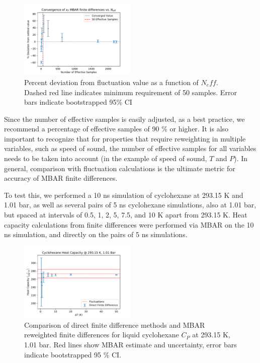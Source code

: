 \documentclass[9pt,bestpractices]{livecoms}
\begin{document}
\begin{figure}[H]
\includegraphics[width=0.5\textwidth]{kt_vs_n_eff.pdf}
\caption{Percent deviation from fluctuation value as a function of $N_eff$.  Dashed red line indicates minimum requirement of 50 samples.  Error bars indicate bootstrapped 95\% CI}
\end{figure}

  Since the number of effective samples is easily adjusted, as a best practice, we recommend a percentage of effective samples of 90 \% or higher.  It is also important to recognize that for properties that require reweighting in multiple variables, such as speed of sound, the number of effective samples for all variables needs to be taken into account (in the example of speed of sound, $T$ and $P$).  In general, comparison with fluctuation calculations is the ultimate metric for accuracy of MBAR finite differences.

To test this, we performed a 10 ns simulation of cyclohexane at 293.15 K and 1.01 bar, as well as several pairs of 5 ns cyclohexane simulations, also at 1.01 bar, but spaced at intervals of 0.5, 1, 2, 5, 7.5, and 10 K apart from 293.15 K. Heat capacity calculations from finite differences were performed via MBAR on the 10 ns simulation, and directly on the pairs of 5 ns simulations. 
\begin{figure}[H]
\includegraphics[width=0.5\textwidth]{cychex_cp_finite_diff.pdf}
\caption{Comparison of direct finite difference methods and MBAR reweighted finite differences for liquid cyclohexane $C_P$ at 293.15 K, 1.01 bar. Red lines show MBAR estimate and uncertainty, error bars indicate bootstrapped 95 \% CI.} 
\end{figure}
\end{document}
